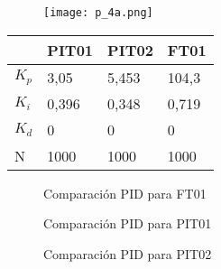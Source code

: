 {\begin{figure}[h!]
	\centering
	\texttt{[image: p\_4a.png]}
	\label{fig:LCs}
\end{figure}

\begin{comment}
Se observa que algunos de los controladores PID son del tipo proporcional integrador, dando así ya que la ganancia en los diferentes escalones en la planta no era constante. Al utilizar un PI genera una salida con error de estado estacionario cero. 
\end{comment}

\begin{table}[h]
	\centering
	\begin{tabular}{|l|l|l|l|}
		\hline
		& PIT01 & PIT02 & FT01 \\ \hline
		$K_p$ & 3,05 & 5,453 & 104,3 \\ \hline
		$K_i$ & 0,396 & 0,348 & 0,719 \\ \hline
		$K_d$ & 0 & 0 & 0 \\ \hline
		N & 1000 & 1000 & 1000 \\ \hline
	\end{tabular}
	\label{tab:pid}
\end{table}

\begin{comment}
	C:\Users\glori\Desktop\DANIELA\VISUAL_DANI\Automa\MATLAB\22-05\Comparacion PID y PLANTAS\FT01
	Respuesta_Strenj
\end{comment}






\begin{figure}[h!]
	\centering
\hspace{-4mm}
	\caption{Comparación PID para FT01} \label{fig:FT1}
\end{figure}

\begin{figure}[h!]
	\centering
\hspace{-4mm}
	\caption{Comparación PID para PIT01} \label{fig:PIT1}
\end{figure}

\begin{figure}[h!]
	\centering
	\hspace{-4mm}
	\caption{Comparación PID para PIT02} \label{fig:PIT2}
\end{figure}


}
